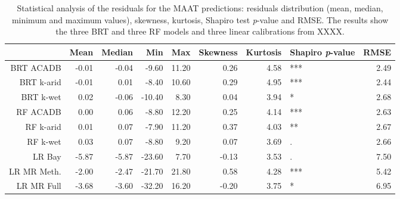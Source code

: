 \begin{table}[ht]
\centering
\caption{Statistical analysis of the residuals for the MAAT predictions: residuals distribution (mean, median, minimum and maximum values), skewness, kurtosis, Shapiro test \textit{p}-value and RMSE. The results show the three BRT and three RF models and three linear calibrations from XXXX.} 
\label{SI_Table_res}
\begin{tabular}{rrrrrrrlr}
  \toprule
 & Mean & Median & Min & Max & Skewness & Kurtosis & Shapiro \textit{p}-value & RMSE \\ 
  \midrule
BRT ACADB & -0.01 & -0.04 & -9.60 & 11.20 & 0.26 & 4.58 & *** & 2.49 \\ 
  BRT k-arid & -0.01 & 0.01 & -8.40 & 10.60 & 0.29 & 4.95 & *** & 2.44 \\ 
  BRT k-wet & 0.02 & -0.06 & -10.40 & 8.30 & 0.04 & 3.94 & * & 2.68 \\ 
  RF ACADB & 0.00 & 0.06 & -8.80 & 12.20 & 0.25 & 4.14 & *** & 2.63 \\ 
  RF k-arid & 0.01 & 0.07 & -7.90 & 11.20 & 0.37 & 4.03 & ** & 2.67 \\ 
  RF k-wet & 0.03 & 0.07 & -8.80 & 9.20 & 0.07 & 3.69 & . & 2.66 \\ 
  LR Bay & -5.87 & -5.87 & -23.60 & 7.70 & -0.13 & 3.53 & . & 7.50 \\ 
  LR MR Meth. & -2.00 & -2.47 & -21.70 & 21.80 & 0.58 & 4.28 & *** & 5.42 \\ 
  LR MR Full & -3.68 & -3.60 & -32.20 & 16.20 & -0.20 & 3.75 & * & 6.95 \\ 
   \bottomrule
\end{tabular}
\end{table}
